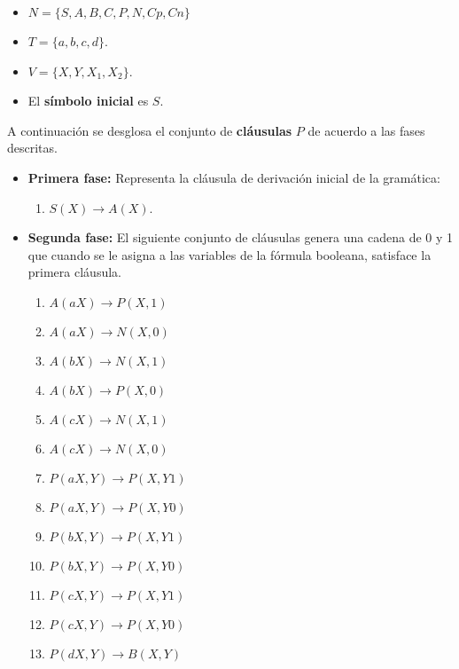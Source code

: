 \documentclass[12pt]{article}
\begin{document}
\begin{itemize}
    \item $N=\{S,A,B,C,P,N,Cp,Cn\}$
    \item $T=\{a,b,c,d\}$.
    \item $V=\{X,Y,X_1,X_2\}$.
    \item El \textbf{símbolo inicial} es $S$.
\end{itemize}

A continuación se desglosa el conjunto de \textbf{cláusulas} $P$ de acuerdo a las fases descritas.

\begin{itemize}
    \item \textbf{Primera fase:} Representa la cláusula de derivación inicial de la gramática:
          \begin{enumerate}
              \item $S(X)\to A(X)$.
          \end{enumerate}
          
    \item \textbf{Segunda fase:} El siguiente conjunto de cláusulas genera una cadena de 0 y 1 que cuando se le asigna a las variables de la fórmula booleana, satisface la primera cláusula.
          \begin{multicols}{2}
              \begin{enumerate}[start=2]
                  \item $A(aX)\to P(X,1)$
                  \item $A(aX)\to N(X,0)$
                  \item $A(bX)\to N(X,1)$
                  \item $A(bX)\to P(X,0)$
                  \item $A(cX)\to N(X,1)$
                  \item $A(cX)\to N(X,0)$
                        
                  \item $P(aX,Y)\to P(X,Y1)$
                  \item $P(aX,Y)\to P(X,Y0)$
                  \item $P(bX,Y)\to P(X,Y1)$
                  \item $P(bX,Y)\to P(X,Y0)$
                  \item $P(cX,Y)\to P(X,Y1)$
                  \item $P(cX,Y)\to P(X,Y0)$
                  \item $P(dX,Y)\to B(X,Y)$
                        

\end{enumerate}
\end{multicols}
\end{itemize}
\end{document}
